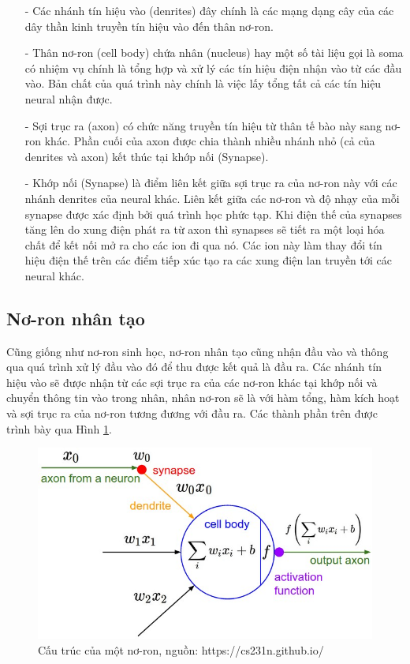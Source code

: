 \begin{itemize}
\item[-]Các nhánh tín hiệu vào (denrites) đây chính là các mạng dạng cây của các dây thần kinh truyền tín hiệu vào đến thân nơ-ron.
\item[-] Thân nơ-ron (cell body) chứa nhân (nucleus) hay một số tài liệu gọi là soma có nhiệm vụ chính là tổng hợp và xử lý các tín hiệu điện nhận vào từ các đầu vào. Bản chất của quá trình này chính là việc lấy tổng tất cả các tín hiệu neural nhận được.

\item[-]Sợi trục ra (axon) có chức năng truyền tín hiệu từ thân tế bào này sang nơ-ron khác. Phần cuối của axon được chia thành nhiều nhánh nhỏ (cả của denrites và axon) kết thúc tại khớp nối (Synapse).
\item[-]Khớp nối (Synapse) là điểm liên kết giữa sợi trục ra của nơ-ron này với các nhánh denrites của neural khác. Liên kết giữa các nơ-ron và độ nhạy của mỗi synapse được xác định bởi quá trình học phức tạp. Khi điện thế của synapses tăng lên do xung điện phát ra từ axon thì synapses sẽ tiết ra một loại hóa chất để kết nối mở ra cho các ion đi qua nó. Các ion này làm thay đổi tín hiệu điện thế trên các điểm tiếp xúc tạo ra các xung điện lan truyền tới các neural khác.
\end{itemize}

\subsection{Nơ-ron nhân tạo}
\label{sec:neuralStruct}
Cũng giống như nơ-ron sinh học, nơ-ron nhân tạo cũng nhận đầu vào và thông qua quá trình xử lý đầu vào đó để thu được kết quả là đầu ra. Các nhánh tín hiệu vào sẽ được nhận từ các sợi trục ra của các nơ-ron khác tại khớp nối và chuyển thông tin vào trong nhân, nhân nơ-ron sẽ là với hàm tổng, hàm kích hoạt và sợi trục ra của nơ-ron tương đương với đầu ra. Các thành phần trên được trình bày qua Hình \ref{fig:aNeural}. 
\begin{center}
    \begin{figure}[h]
    \begin{center}
     \includegraphics[scale=0.5]{chap3/image/neuron.jpeg}
    \end{center}
    \caption{Cấu trúc của một nơ-ron, nguồn: https://cs231n.github.io/}
 	\label{fig:aNeural}
    \end{figure}
\end{center}

